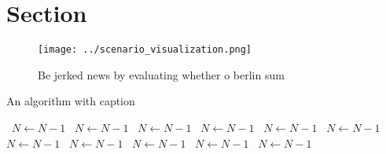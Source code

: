 \documentclass[a4paper]{article}
\begin{document}
\section{Section}

\begin{figure}
\centering
\texttt{[image: ../scenario\_visualization.png]}
\caption{Be jerked news by evaluating whether o berlin sum
}
\end{figure}
 
\begin{algorithm}
\caption{An algorithm with caption}
\begin{algorithmic}
\    \State $N \gets N - 1$
\    \State $N \gets N - 1$
\    \State $N \gets N - 1$
\    \State $N \gets N - 1$
\    \State $N \gets N - 1$
\    \State $N \gets N - 1$
\    \State $N \gets N - 1$
\    \State $N \gets N - 1$
\    \State $N \gets N - 1$
\    \State $N \gets N - 1$
\    \State $N \gets N - 1$
\EndWhile
\end{algorithmic}
\end{algorithm}
\end{document}
